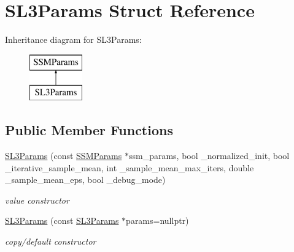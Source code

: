 \hypertarget{structSL3Params}{\section{S\-L3\-Params Struct Reference}
\label{structSL3Params}
}
Inheritance diagram for S\-L3\-Params\-:\begin{figure}[H]
\begin{center}
\leavevmode
\includegraphics[height=2.000000cm]{structSL3Params}
\end{center}
\end{figure}
\subsection*{Public Member Functions}
\begin{DoxyCompactItemize}
\item 
\hypertarget{structSL3Params_a3a15351500d381d0a43657d04a79abca}{\hyperlink{structSL3Params_a3a15351500d381d0a43657d04a79abca}{S\-L3\-Params} (const \hyperlink{structSSMParams}{S\-S\-M\-Params} $\ast$ssm\-\_\-params, bool \-\_\-normalized\-\_\-init, bool \-\_\-iterative\-\_\-sample\-\_\-mean, int \-\_\-sample\-\_\-mean\-\_\-max\-\_\-iters, double \-\_\-sample\-\_\-mean\-\_\-eps, bool \-\_\-debug\-\_\-mode)}\label{structSL3Params_a3a15351500d381d0a43657d04a79abca}

\begin{DoxyCompactList}\small\item\em value constructor \end{DoxyCompactList}\item 
\hypertarget{structSL3Params_acff7e46460a9b098b6e22362cf56ab1a}{\hyperlink{structSL3Params_acff7e46460a9b098b6e22362cf56ab1a}{S\-L3\-Params} (const \hyperlink{structSL3Params}{S\-L3\-Params} $\ast$params=nullptr)}\label{structSL3Params_acff7e46460a9b098b6e22362cf56ab1a}

\begin{DoxyCompactList}\small\item\em copy/default constructor \end{DoxyCompactList}\end{DoxyCompactItemize}

